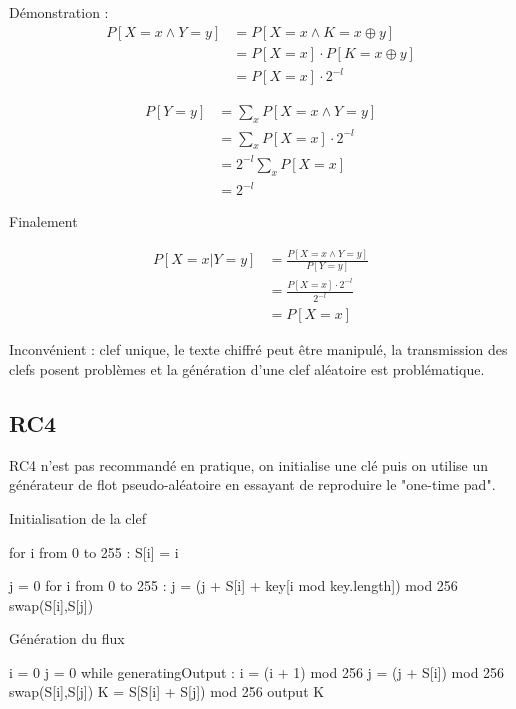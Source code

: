 \documentclass[11pt,a4paper]{report}
\begin{document}
Démonstration :
\begin{align*}
P[X = x \wedge Y = y] &= P[X=x \wedge K = x \oplus y] \\
                      &= P[X=x] \cdot P[K=x \oplus y] \\
                      &= P[X=x] \cdot 2^{-l}
\end{align*}

\begin{align*}
P[Y = y] &= \sum_x P[X=x \wedge Y = y] \\
         &= \sum_x P[X=x] \cdot 2^{-l} \\
         &= 2^{-l} \sum_x P[X=x]\\
         &= 2^{-l}
\end{align*}

Finalement

\begin{align*}
P[X=x | Y=y] &= \frac{P[X=x \wedge Y=y]}{P[Y=y]} \\
             &= \frac{P[X=x] \cdot 2^{-l}}{2^{-l}} \\
             &= P[X=x]
\end{align*}

Inconvénient : clef unique, le texte chiffré peut être manipulé, la transmission des clefs posent problèmes et la génération d'une clef aléatoire est problématique.

\subsection{RC4}

RC4 n'est pas recommandé en pratique, on initialise une clé puis on utilise un générateur de flot pseudo-aléatoire en essayant de reproduire le "one-time pad".
\begin{listing}[H]
\caption{Initialisation de la clef}
\begin{pythoncode}
for i from 0 to 255 :
    S[i] = i

j = 0
for i from 0 to 255 :
    j = (j + S[i] + key[i mod key.length]) mod 256
    swap(S[i],S[j])
\end{pythoncode}
\end{listing}

\begin{listing}[H]
\caption{Génération du flux}
\begin{pythoncode}
i = 0
j = 0
while generatingOutput :
    i = (i + 1) mod 256
    j = (j + S[i]) mod 256
    swap(S[i],S[j])
    K = S[S[i] + S[j]) mod 256
    output K
\end{pythoncode}
\end{listing}
\end{document}
